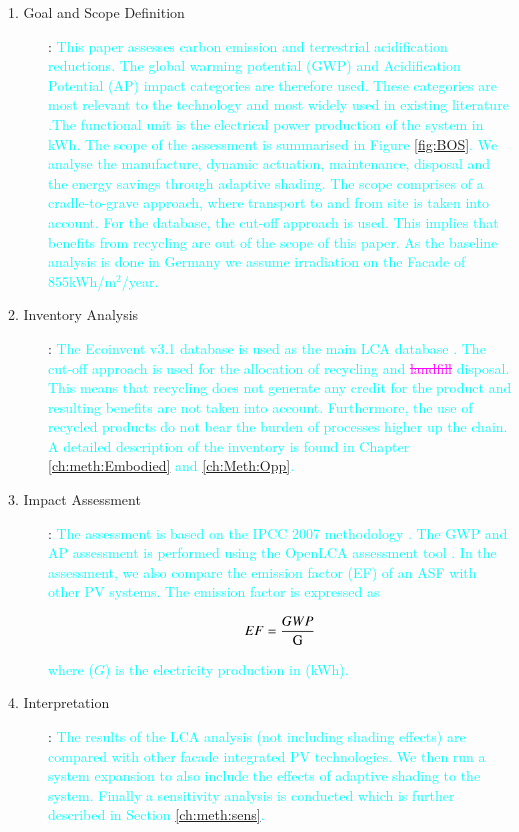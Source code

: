 \begin{description}

\item[1. Goal and Scope Definition]: \textcolor{cyan}{This paper assesses carbon emission and terrestrial acidification reductions. The global warming potential (GWP) and Acidification Potential (AP) impact categories are therefore used. These categories are most relevant to the technology and most widely used in existing literature \cite{ortiz2009sustainability}.The functional unit is the electrical power production of the system in kWh.}
\textcolor{cyan}{The scope of the assessment is summarised in Figure \ref{fig:BOS}. We analyse the  manufacture, dynamic actuation, maintenance, disposal and the energy savings through adaptive shading. The scope comprises of a cradle-to-grave approach, where transport to and from site is taken into account. For the database, the cut-off approach is used. This implies that benefits from recycling are out of the scope of this paper. As the baseline analysis is done in Germany we assume irradiation on the Facade of 855kWh/m$^2$/year.}

\item[2. Inventory Analysis]: \textcolor{cyan}{The Ecoinvent v3.1 database is used as the main LCA database \cite{frischknecht2005ecoinvent}. The cut-off approach is used for the allocation of recycling and \textcolor{magenta}{\sout{ landfill}} disposal. This means that recycling does not generate any credit for the product and resulting benefits are not taken into account. Furthermore, the use of recycled products do not bear the burden of processes higher up the chain. A detailed description of the inventory is found in Chapter \ref{ch:meth:Embodied} and \ref{ch:Meth:Opp}.}

\item[3. Impact Assessment]: \textcolor{cyan}{The assessment is based on the IPCC 2007 methodology \cite{solomon2007climate}. The GWP and AP assessment is performed using the OpenLCA assessment tool \cite{ciroth2007ict}. In the assessment, we also compare the emission factor (EF) of an ASF with other PV systems. The emission factor is expressed as}

\begin{equation}
EF=\frac{GWP}{\mathrm{G}}   
\tagaddtext{[$\frac{kg CO_{2-eq}}{kWh}$]}
\label{eq:EF}
\end{equation}

\textcolor{cyan}{where ($G$) is the electricity production in (kWh).}


\item[4. Interpretation]: \textcolor{cyan}{The results of the LCA analysis (not including shading effects) are compared with other facade integrated PV technologies. We then run a system expansion to also include the effects of adaptive shading to the system. Finally a sensitivity analysis is conducted which is further described in Section \ref{ch:meth:sens}.}


\end{description}

